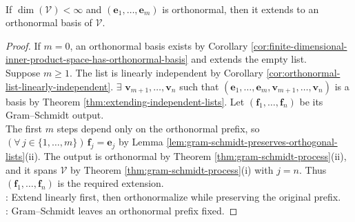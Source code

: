 \begin{corollary} \label{cor:orthonormal-list-extends-to-basis} \\
If $\dim(\mathcal{V})<\infty$ and $(\mathbf{e}_1,\ldots,\mathbf{e}_m)$ is orthonormal, then it extends to an orthonormal basis of $\mathcal{V}$.
\begin{proof}
If $m=0$, an orthonormal basis exists by Corollary \ref{cor:finite-dimensional-inner-product-space-has-orthonormal-basis} and extends the empty list.\\
Suppose $m\geq1$. The list is linearly independent by Corollary \ref{cor:orthonormal-list-linearly-independent}. $\exists$ $\mathbf{v}_{m+1},\ldots,\mathbf{v}_n$ such that $(\mathbf{e}_1,\ldots,\mathbf{e}_m,\mathbf{v}_{m+1},\ldots,\mathbf{v}_n)$ is a basis by Theorem \ref{thm:extending-independent-lists}. Let $(\mathbf{f}_1,\ldots,\mathbf{f}_n)$ be its Gram--Schmidt output.\\
The first $m$ steps depend only on the orthonormal prefix, so $(\forall\,j\in\{1,\ldots,m\})\,\mathbf{f}_j=\mathbf{e}_j$ by Lemma \ref{lem:gram-schmidt-preserves-orthogonal-lists}(ii). The output is orthonormal by Theorem \ref{thm:gram-schmidt-process}(ii), and it spans $\mathcal{V}$ by Theorem \ref{thm:gram-schmidt-process}(i) with $j=n$. Thus $(\mathbf{f}_1,\ldots,\mathbf{f}_n)$ is the required extension.\\
: Extend linearly first, then orthonormalize while preserving the original prefix.\\
: Gram--Schmidt leaves an orthonormal prefix fixed.
\end{proof}
\end{corollary}
